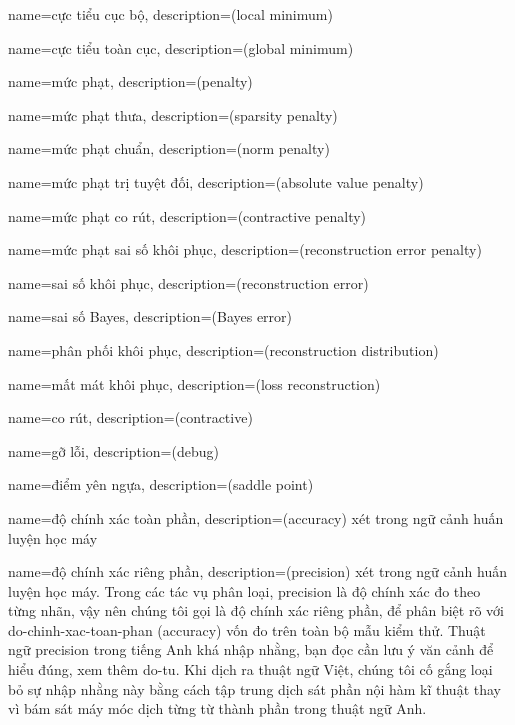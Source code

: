 {
    name={cực tiểu cục bộ},
    description={(local minimum)}
}

{
    name={cực tiểu toàn cục},
    description={(global minimum)}
}

{
    name={mức phạt},
    description={(penalty)}
}

{
    name={mức phạt thưa},
    description={(sparsity penalty)}
}

{
    name={mức phạt chuẩn},
    description={(norm penalty)}
}

{
    name={mức phạt trị tuyệt đối},
    description={(absolute value penalty)}
}

{
    name={mức phạt co rút},
    description={(contractive penalty)}
}

{
    name={mức phạt sai số khôi phục},
    description={(reconstruction error penalty)}
}

{
    name={sai số khôi phục},
    description={(reconstruction error)}
}

{
    name={sai số Bayes},
    description={(Bayes error)}
}

{
    name={phân phối khôi phục},
    description={(reconstruction distribution)}
}

{
    name={mất mát khôi phục},
    description={(loss reconstruction)}
}

{
    name={co rút},
    description={(contractive)}
}

{
    name={gỡ lỗi},
    description={(debug)}
}

{
    name={điểm yên ngựa},
    description={(saddle point)}
}

{
    name={độ chính xác toàn phần},
    description={(accuracy) xét trong ngữ cảnh huấn luyện học máy}
}

{
    name={độ chính xác riêng phần},
    description={(precision) xét trong ngữ cảnh huấn luyện học máy.
        Trong các tác vụ phân loại, precision là độ chính xác đo
        theo từng nhãn, vậy nên chúng tôi gọi là độ chính xác riêng phần,
        để phân biệt rõ với \gls{do-chinh-xac-toan-phan} (accuracy) vốn
        đo trên toàn bộ mẫu kiểm thử. Thuật ngữ precision trong tiếng Anh
        khá nhập nhằng, bạn đọc cần lưu ý văn cảnh để hiểu đúng, xem thêm
        \gls{do-tu}. Khi dịch ra thuật ngữ Việt, chúng tôi cố gắng loại bỏ
        sự nhập nhằng này bằng cách tập trung dịch sát phần nội hàm kĩ thuật
        thay vì bám sát máy móc dịch từng từ thành phần trong thuật ngữ Anh.}
}

